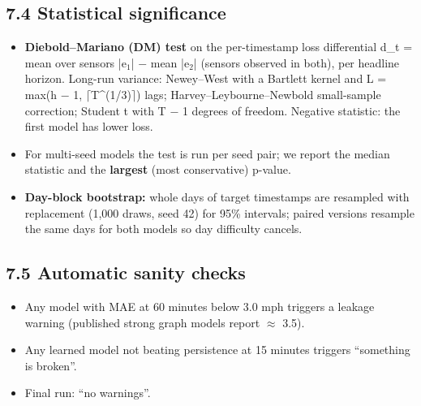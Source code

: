 \documentclass[10pt,a4paper]{article}
\begin{document}
\subsection*{7.4 Statistical significance}
\begin{itemize}[nosep,leftmargin=*]
\item \textbf{Diebold--Mariano (DM) test} on the per-timestamp loss differential d\_\allowbreak{}t = mean over sensors |e\ensuremath{_{1}}| \ensuremath{-} mean |e\ensuremath{_{2}}| (sensors observed in both), per headline horizon. Long-run variance: Newey--West with a Bartlett kernel and L = max(h \ensuremath{-} 1, \ensuremath{\lceil}T\^{}(1/\allowbreak{}3)\ensuremath{\rceil}) lags; Harvey--Leybourne--Newbold small-sample correction; Student t with T \ensuremath{-} 1 degrees of freedom. Negative statistic: the first model has lower loss.
\item For multi-seed models the test is run per seed pair; we report the median statistic and the \textbf{largest} (most conservative) p-value.
\item \textbf{Day-block bootstrap:} whole days of target timestamps are resampled with replacement (1,000 draws, seed 42) for 95\% intervals; paired versions resample the same days for both models so day difficulty cancels.
\end{itemize}

\subsection*{7.5 Automatic sanity checks}
\begin{itemize}[nosep,leftmargin=*]
\item Any model with MAE at 60 minutes below 3.0 mph triggers a leakage warning (published strong graph models report \ensuremath{\approx} 3.5).
\item Any learned model not beating persistence at 15 minutes triggers ``something is broken''.
\item Final run: ``no warnings''.
\end{itemize}

\clearpage
\end{document}
